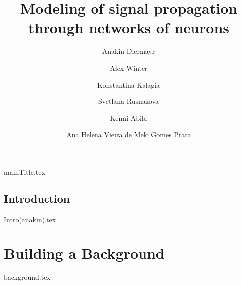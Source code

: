 \documentclass[printBibble]{myRUCProject}
\title{Modeling of signal propagation through networks of neurons}
\author{Anakin Diermayr \and  Alex Winter \and Konstantina Kalagia \and Svetlana Rusnakova \and Kenni Abild \and  Ana Helena Vieira de Melo Gomes Prata}
\begin{document}


{mainTitle.tex}


{%
\setlength{\parskip}{0.75em} %
\tableofcontents%

\printacronyms%

\listoftodos
}










\newpage
{}
\chapter*{Introduction} 
{Intro(anakin).tex}


\part{Building a Background}
{background.tex}





\end{document}

